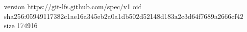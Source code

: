 version https://git-lfs.github.com/spec/v1
oid sha256:05949117382c1ae16a345eb2a0a1db502d52148d183a2c3d64f7689a2666cf42
size 174916
